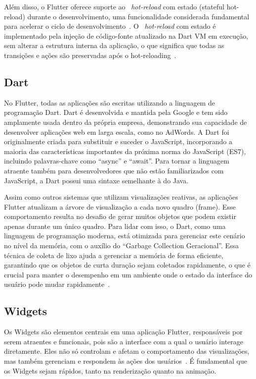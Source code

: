 Além disso, o Flutter oferece suporte ao ~\textit{hot-reload} com estado (stateful hot-reload) durante o desenvolvimento, uma funcionalidade considerada fundamental para acelerar o ciclo de desenvolvimento~\cite{wu2018react}.
O ~\textit{hot-reload} com estado é implementado pela injeção de código-fonte atualizado na Dart VM em execução, sem alterar a estrutura interna da aplicação, o que significa que todas as transições e ações são preservadas após o hot-reloading~\cite{flutter}.

\subsection{Dart}\label{subsec: dart}
No Flutter, todas as aplicações são escritas utilizando a linguagem de programação Dart.
Dart é desenvolvida e mantida pela Google e tem sido amplamente usada dentro da própria empresa, demonstrando sua capacidade de desenvolver aplicações web em larga escala, como no AdWords.
A Dart foi originalmente criada para substituir e suceder o JavaScript, incorporando a maioria das características importantes da próxima norma do JavaScript (ES7), incluindo palavras-chave como “async” e “await”.
Para tornar a linguagem atraente também para desenvolvedores que não estão familiarizados com JavaScript, a Dart possui uma sintaxe semelhante à do Java.

Assim como outros sistemas que utilizam visualizações reativas, as aplicações Flutter atualizam a árvore de visualização a cada novo quadro (frame).
Esse comportamento resulta no desafio de gerar muitos objetos que podem existir apenas durante um único quadro.
Para lidar com isso, o Dart, como uma linguagem de programação moderna, está otimizada para gerenciar este cenário no nível da memória, com o auxílio do “Garbage Collection Geracional”.
Essa técnica de coleta de lixo ajuda a gerenciar a memória de forma eficiente, garantindo que os objetos de curta duração sejam coletados rapidamente, o que é crucial para manter o desempenho em um ambiente onde o estado da interface do usuário pode mudar rapidamente~\cite{flutter}.

\subsection{Widgets}\label{subsec: widgets}
Os Widgets são elementos centrais em uma aplicação Flutter, responsáveis por serem atraentes e funcionais, pois são a interface com a qual o usuário interage diretamente.
Eles não só controlam e afetam o comportamento das visualizações, mas também gerenciam e respondem às ações dos usuários~\cite{faust2020using}.
É fundamental que os Widgets sejam rápidos, tanto na renderização quanto na animação.

